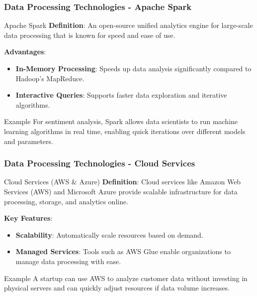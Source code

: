 \documentclass{beamer}
\begin{document}
\begin{frame}[fragile]
    \frametitle{Data Processing Technologies - Apache Spark}
    \begin{block}{Apache Spark}
        \textbf{Definition}: An open-source unified analytics engine for large-scale data processing that is known for speed and ease of use.
        
        \textbf{Advantages}:
        \begin{itemize}
            \item \textbf{In-Memory Processing}: Speeds up data analysis significantly compared to Hadoop's MapReduce.
            \item \textbf{Interactive Queries}: Supports faster data exploration and iterative algorithms.
        \end{itemize}
    \end{block}
    
    \begin{block}{Example}
        For sentiment analysis, Spark allows data scientists to run machine learning algorithms in real time, enabling quick iterations over different models and parameters.
    \end{block}
\end{frame}

\begin{frame}[fragile]
    \frametitle{Data Processing Technologies - Cloud Services}
    \begin{block}{Cloud Services (AWS \& Azure)}
        \textbf{Definition}: Cloud services like Amazon Web Services (AWS) and Microsoft Azure provide scalable infrastructure for data processing, storage, and analytics online.
        
        \textbf{Key Features}:
        \begin{itemize}
            \item \textbf{Scalability}: Automatically scale resources based on demand.
            \item \textbf{Managed Services}: Tools such as AWS Glue enable organizations to manage data processing with ease.
        \end{itemize}
    \end{block}
    
    \begin{block}{Example}
        A startup can use AWS to analyze customer data without investing in physical servers and can quickly adjust resources if data volume increases.
    \end{block}
\end{frame}
\end{document}
